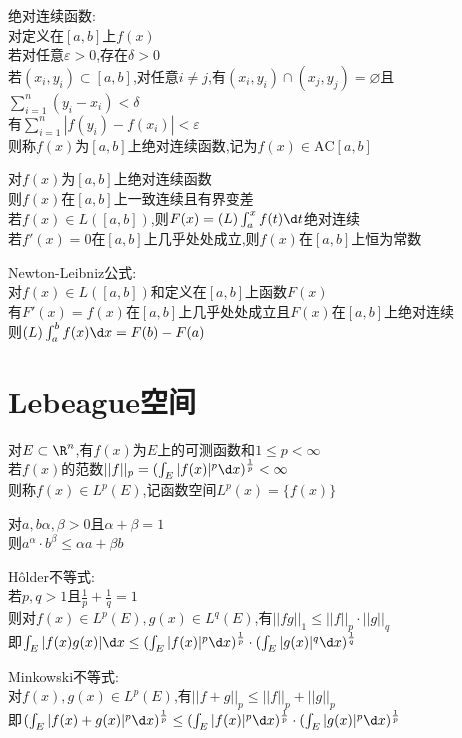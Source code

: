 \begin{dingyi}
绝对连续函数:\\
对定义在$[a,b]$上$f(x)$\\
若对任意$\varepsilon>0$,存在$\delta>0$\\
若$(x_i,y_i)\subset[a,b]$,对任意$i\neq j$,有$(x_i,y_i)\cap (x_j,y_j)=\varnothing$且$\sum\limits_{i=1}^{n}(y_i-x_i)<\delta$\\
有$\sum\limits_{i=1}^{n}|f(y_i)-f(x_i)|<\varepsilon$\\
则称$f(x)$为$[a,b]$上绝对连续函数,记为$f(x)\in \mathrm{AC}[a,b]$
\end{dingyi}

\begin{dingli}
对$f(x)$为$[a,b]$上绝对连续函数\\
则$f(x)$在$[a,b]$上一致连续且有界变差\\
若$f(x)\in L([a,b])$,则$F(x)=(L)\int_{a}^{x}f(t)\d t$绝对连续\\
若$f'(x)=0$在$[a,b]$上几乎处处成立,则$f(x)$在$[a,b]$上恒为常数
\end{dingli}

\begin{dingli}
Newton-Leibniz公式:\\
对$f(x)\in L([a,b])$和定义在$[a,b]$上函数$F(x)$\\
有$F'(x)=f(x)$在$[a,b]$上几乎处处成立且$F(x)$在$[a,b]$上绝对连续\\
则$(L)\int_{a}^{b}f(x)\d x=F(b)-F(a)$
\end{dingli}

\chapter{Lebeague空间}

\begin{dingyi}
对$E\subset \R^n$,有$f(x)$为$E$上的可测函数和$1\leq p<\infty$\\
若$f(x)$的范数$||f||_{p}=(\int_{E}|f(x)|^{p}\d x)^{\frac{1}{p}}<\infty$\\
则称$f(x)\in L^p(E)$,记函数空间$L^p(x)=\{f(x)\}$
\end{dingyi}

\begin{dingli}
对$a,b\alpha,\beta>0$且$\alpha+\beta=1$\\
则$a^{\alpha}\cdot b^{\beta}\leq \alpha a+\beta b$
\end{dingli}

\begin{dingli}
Hôlder不等式:\\
若$p,q>1$且$\frac{1}{p}+\frac{1}{q}=1$\\
则对$f(x)\in L^p(E),g(x)\in L^q(E)$,有$||fg||_{1}\leq ||f||_{p}\cdot||g||_{q}$\\
即$\int_{E}|f(x)g(x)|\d x\leq (\int_{E}|f(x)|^{p}\d x)^{\frac{1}{p}}\cdot(\int_{E}|g(x)|^{q}\d x)^{\frac{1}{q}}$
\end{dingli}

\begin{dingli}
Minkowski不等式:\\
对$f(x),g(x)\in L^p(E)$,有$||f+g||_{p}\leq ||f||_{p}+||g||_{p}$\\
即$(\int_{E}|f(x)+g(x)|^{p}\d x)^{\frac{1}{p}}\leq (\int_{E}|f(x)|^{p}\d x)^{\frac{1}{p}}\cdot(\int_{E}|g(x)|^{p}\d x)^{\frac{1}{p}}$
\end{dingli}

\endinput
%